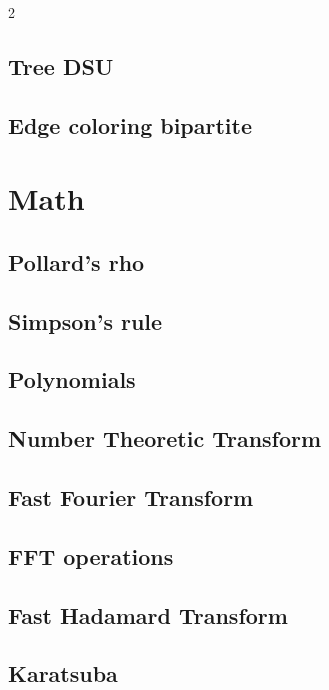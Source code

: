 \begin{multicols}{2}
\subsection{Tree DSU}

\subsection{Edge coloring bipartite}

\section{Math}
\subsection{Pollard's rho}

\subsection{Simpson's rule}

\subsection{Polynomials}

\subsection{Number Theoretic Transform}
\subsection{Fast Fourier Transform}
\subsection{FFT operations}
\subsection{Fast Hadamard Transform}

\subsection{Karatsuba}


\end{multicols}
